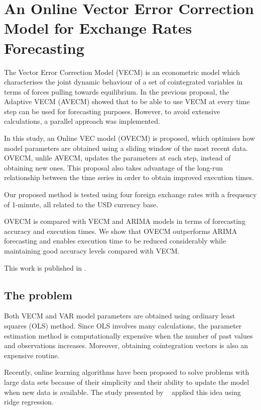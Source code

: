 
\chapter{An Online Vector Error Correction Model for Exchange Rates Forecasting}


The Vector Error Correction Model (VECM) is an econometric model which
characterises the joint dynamic behaviour of a set of cointegrated variables in
terms of forces pulling towards equilibrium. In the previous proposal, the
Adaptive VECM (AVECM) showed that to be able to use VECM at every time step can
be used for forecasting purposes. However, to avoid extensive calculations, a
parallel approach was implemented.

In this study, an Online VEC model (OVECM) is proposed, which optimises how
model parameters are obtained using a sliding window of the most recent data.
OVECM, unlile AVECM, updates the parameters at each step, instead of obtaining
new ones. This proposal also takes advantage of the long-run relationship
between the time series in order to obtain improved execution times. 

Our proposed method is tested using four foreign exchange rates with a frequency
of 1-minute, all related to the USD currency base. 

OVECM is compared with VECM and ARIMA models in terms of forecasting accuracy
and execution times. We show that OVECM outperforms ARIMA forecasting and
enables execution time to be reduced considerably while maintaining good
accuracy levels compared with VECM.

This work is published in \cite{icpram15}.

\vspace{0.5cm} 

\newpage
\section{The problem}

Both VECM and VAR model parameters are obtained using ordinary least squares
(OLS) method. Since OLS involves many calculations, the parameter estimation
method is computationally expensive when the number of past values and
observations increases. Moreover, obtaining cointegration vectors is also an
expensive routine.

Recently, online learning algorithms have been proposed to solve problems with
large data sets because of their simplicity and their ability to update the
model when new data is available. The study presented by ~\cite{arce+salinas2012}
applied this idea using ridge regression.

